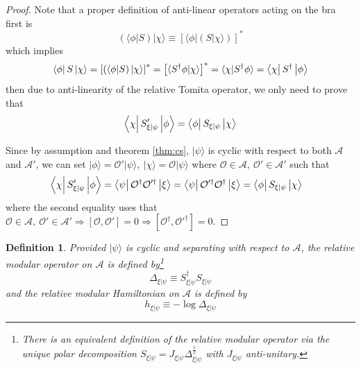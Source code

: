 \documentclass[a4paper,11pt]{article}
\newtheorem{defn}[thm]{Definition}
\newcommand{\ket}[1]{| #1 \rangle } %
\newcommand{\braket}[2]{\langle  #1 \vphantom{#2} | #2 \vphantom{#1} \rangle } %
\newcommand{\diracprod}[3]{\left\langle  #1 \vphantom{#2#3} \right|#2 \left| #3 \vphantom{#1#2} \right\rangle } %
\renewcommand{\=}[1]{\stackrel{#1}{=}} %
\def\A{\mathcal{A}}
\def\O{\mathcal{O}}
\begin{document}
\begin{proof}
	Note that a proper definition of anti-linear operators acting on the bra first is
	\begin{equation}
		\left(\langle\phi|S\right)|\chi\rangle\equiv \left[\langle\phi|\left(S|\chi\rangle\right)\right]^*
	\end{equation}
	which implies
	\begin{equation}\label{eq:anti-linear}
		\diracprod{\phi}{S}{\chi}=\left[\left(\langle\phi|S\right)|\chi\rangle\right]^*=\left[\braket{S^\dagger\phi}{\chi}\right]^*=\braket{\chi}{S^\dagger\phi}=\diracprod{\chi}{S^\dagger}{\phi}
	\end{equation}
	then due to anti-linearity of the relative Tomita operator, we only need to prove that
	\begin{equation}
		\diracprod{\chi}{S'_{\xi|\psi}}{\phi}=\diracprod{\phi}{S_{\xi|\psi}}{\chi}
	\end{equation}
	
	Since by assumption and theorem \ref{thm:cs}, $\ket{\psi}$ is cyclic with respect to both $\A$ and $\A'$, we can set $\ket{\phi}=\O'\ket{\psi},~\ket{\chi}=\O\ket{\psi}$ where $\O\in\A,~\O'\in\A'$ such that
	\begin{align}
		&\diracprod{\chi}{S'_{\xi|\psi}}{\phi}=\diracprod{\psi}{\O^\dagger \O'^\dagger}{\xi}=\diracprod{\psi}{\O'^\dagger \O^\dagger}{\xi}=\diracprod{\phi}{S_{\xi|\psi}}{\chi}
	\end{align}
	where the second equality uses that $\O\in\A,~\O'\in\A'\Rightarrow [\O,\O']=0\Rightarrow[\O^\dagger,\O'^\dagger]=0$.
\end{proof}








\begin{defn}
	Provided $\ket{\psi}$ is cyclic and separating with respect to $\A$, the relative modular operator on $\A$ is defined by\footnote{There is an equivalent definition of the relative modular operator via the unique polar decomposition $S_{\xi|\psi}=J_{\xi|\psi}\Delta_{\xi|\psi}^{\frac{1}{2}}$ with $J_{\xi|\psi}$ anti-unitary.}
	\begin{equation}
		\Delta_{\xi|\psi}\equiv S^\dagger_{\xi|\psi}S_{\xi|\psi}
	\end{equation}
	and the relative modular Hamiltonian on $\A$ is defined by 
	\begin{equation}
		h_{\xi|\psi}\equiv-\log \Delta_{\xi|\psi}
	\end{equation}
\end{defn}
\end{document}
